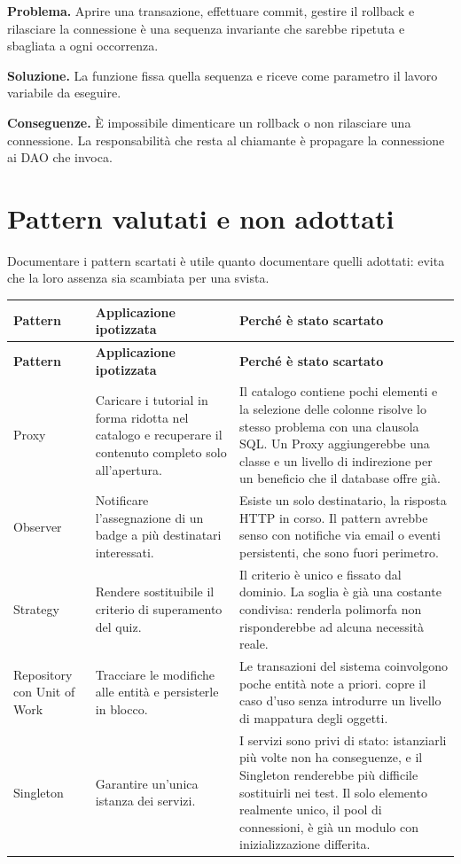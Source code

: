 \textbf{Problema.} Aprire una transazione, effettuare commit, gestire il
rollback e rilasciare la connessione è una sequenza invariante che sarebbe
ripetuta e sbagliata a ogni occorrenza.

\textbf{Soluzione.} La funzione  fissa quella sequenza e
riceve come parametro il lavoro variabile da eseguire.

\textbf{Conseguenze.} È impossibile dimenticare un rollback o non rilasciare
una connessione. La responsabilità che resta al chiamante è propagare la
connessione ai DAO che invoca.

\section{Pattern valutati e non adottati}

Documentare i pattern scartati è utile quanto documentare quelli adottati:
evita che la loro assenza sia scambiata per una svista.

\begin{longtable}{@{}L{2.8cm} L{5.4cm} L{6.2cm}@{}}
\toprule
\textbf{Pattern} & \textbf{Applicazione ipotizzata} & \textbf{Perché è stato scartato} \\
\midrule
\endfirsthead
\toprule
\textbf{Pattern} & \textbf{Applicazione ipotizzata} & \textbf{Perché è stato scartato} \\
\midrule
\endhead
\bottomrule
\endlastfoot

Proxy &
Caricare i tutorial in forma ridotta nel catalogo e recuperare il contenuto
completo solo all'apertura. &
Il catalogo contiene pochi elementi e la selezione delle colonne risolve lo
stesso problema con una clausola SQL. Un Proxy aggiungerebbe una classe e un
livello di indirezione per un beneficio che il database offre già. \\

Observer &
Notificare l'assegnazione di un badge a più destinatari interessati. &
Esiste un solo destinatario, la risposta HTTP in corso. Il pattern avrebbe
senso con notifiche via email o eventi persistenti, che sono fuori
perimetro. \\

Strategy &
Rendere sostituibile il criterio di superamento del quiz. &
Il criterio è unico e fissato dal dominio. La soglia è già una costante
condivisa: renderla polimorfa non risponderebbe ad alcuna necessità reale. \\

Repository con Unit of Work &
Tracciare le modifiche alle entità e persisterle in blocco. &
Le transazioni del sistema coinvolgono poche entità note a priori.
 copre il caso d'uso senza introdurre un livello di
mappatura degli oggetti. \\

Singleton &
Garantire un'unica istanza dei servizi. &
I servizi sono privi di stato: istanziarli più volte non ha conseguenze, e
il Singleton renderebbe più difficile sostituirli nei test. Il solo elemento
realmente unico, il pool di connessioni, è già un modulo con inizializzazione
differita. \\

\end{longtable}


